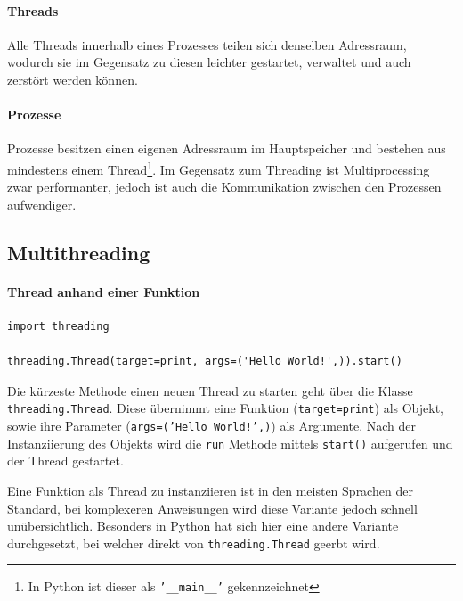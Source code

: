 \documentclass[a4paper,11pt]{article}
\begin{document}
\paragraph{Threads}
Alle Threads innerhalb eines Prozesses teilen sich denselben Adressraum, wodurch sie im Gegensatz zu diesen leichter gestartet, verwaltet und auch zerst\"ort werden k\"onnen.

\paragraph{Prozesse}
Prozesse besitzen einen eigenen Adressraum im Hauptspeicher und bestehen aus mindestens einem Thread\footnote{In Python ist dieser als \texttt{'__main__'} gekennzeichnet}.
Im Gegensatz zum Threading ist Multiprocessing zwar performanter, jedoch ist auch die Kommunikation zwischen den Prozessen aufwendiger.

\newpage

\subsection{Multithreading}

\paragraph{Thread anhand einer Funktion}
\begin{verbatim}
import threading

threading.Thread(target=print, args=('Hello World!',)).start()
\end{verbatim}
\begin{flushleft}
Die k\"urzeste Methode einen neuen Thread zu starten geht \"uber die Klasse \texttt{threading.Thread}.
Diese \"ubernimmt eine Funktion (\texttt{target=print}) als Objekt, sowie ihre Parameter (\texttt{args=('Hello World!',)}) als Argumente.
Nach der Instanziierung des Objekts wird die \texttt{run} Methode mittels \texttt{start()} aufgerufen und der Thread gestartet.
\end{flushleft}
Eine Funktion als Thread zu instanziieren ist in den meisten Sprachen der Standard, bei komplexeren Anweisungen wird diese Variante jedoch schnell un\"ubersichtlich.
Besonders in Python hat sich hier eine andere Variante durchgesetzt, bei welcher direkt von \texttt{threading.Thread} geerbt wird.
\end{document}
